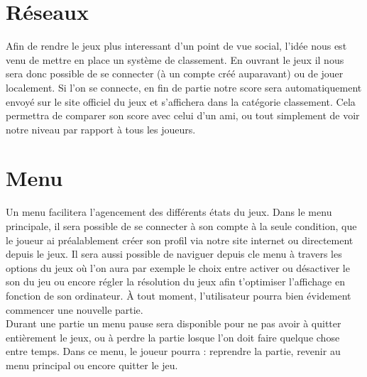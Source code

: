 \documentclass [11pt]{report}
\begin{document}
	\section {Réseaux}
		Afin de rendre le jeux plus interessant d'un point de vue social, l'idée nous est venu de mettre en place un système de classement. En ouvrant le jeux il nous sera donc possible de se connecter (à un compte créé auparavant) ou de jouer localement. Si l'on se connecte, en fin de partie notre score sera automatiquement envoyé sur le site officiel du jeux et s'affichera dans la catégorie classement. Cela permettra de comparer son score avec celui d'un ami, ou tout simplement de voir notre niveau par rapport à tous les joueurs.\\\vspace{3mm}


	




	\section {Menu}
		Un menu facilitera l'agencement des différents états du jeux. Dans le menu principale, il sera possible de se connecter à son compte à la seule condition, que le joueur ai préalablement créer son profil via notre site internet ou directement depuis le jeux. Il sera aussi possible de naviguer depuis cle menu à travers les options du jeux 		où l'on aura par exemple le choix entre activer ou désactiver le son du jeu ou encore régler la résolution du jeux afin t'optimiser l'affichage en fonction de son ordinateur. \`A tout moment, l'utilisateur pourra bien évidement commencer une nouvelle partie. \\
		\indent Durant une partie un menu pause sera disponible pour ne pas avoir à quitter entièrement le jeux, ou à perdre la partie losque l'on doit faire quelque chose entre temps. Dans ce menu, le joueur pourra : reprendre la partie, revenir au menu principal ou encore quitter le jeu.\\\vspace{5mm}
\end{document}
